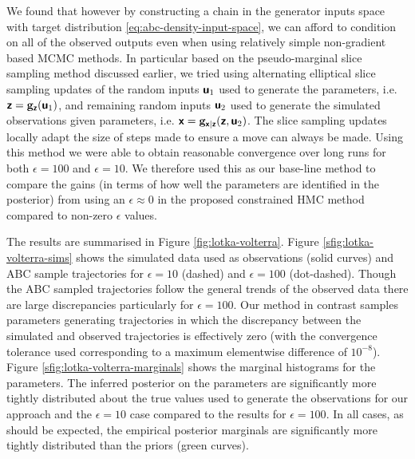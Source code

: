 We found that however by constructing a chain in the generator inputs space with target distribution \eqref{eq:abc-density-input-space}, we can afford to condition on all of the observed outputs even when using relatively simple non-gradient based \ac{MCMC} methods. In particular based on the pseudo-marginal slice sampling method \citep{murray2010slice} discussed earlier, we tried using alternating elliptical slice sampling updates of the random inputs $\boldsymbol{\mathsf{u}}_1$ used to generate the parameters, i.e. $\boldsymbol{\mathsf{z}} = {\mathbf{g}}_{\boldsymbol{\mathsf{z}}}(\boldsymbol{\mathsf{u}}_1)$, and remaining random inputs $\boldsymbol{\mathsf{u}}_2$ used to generate the simulated observations given parameters, i.e. $\boldsymbol{\mathsf{x}} = {\mathbf{g}}_{\boldsymbol{\mathsf{x}}|\boldsymbol{\mathsf{z}}}(\boldsymbol{\mathsf{z}},\boldsymbol{\mathsf{u}}_2)$. The slice sampling updates locally adapt the size of steps made to ensure a move can always be made. Using this method we were able to obtain reasonable convergence over long runs for both $\epsilon=100$ and $\epsilon=10$. We therefore used this as our base-line method to compare the gains (in terms of how well the parameters are identified in the posterior) from using an $\epsilon \approx 0$ in the proposed constrained \ac{HMC} method compared to non-zero $\epsilon$ values.

The results are summarised in Figure \ref{fig:lotka-volterra}. Figure \ref{sfig:lotka-volterra-sims} shows the simulated data used as observations (solid curves) and \ac{ABC} sample trajectories for $\epsilon=10$ (dashed) and $\epsilon=100$ (dot-dashed). Though the \ac{ABC} sampled trajectories follow the general trends of the observed data there are large discrepancies particularly for $\epsilon=100$. Our method in contrast samples parameters generating trajectories in which the discrepancy between the simulated and observed trajectories is effectively zero (with the convergence tolerance used corresponding to a maximum elementwise difference of $10^{-8}$). Figure \ref{sfig:lotka-volterra-marginals} shows the marginal histograms for the parameters. The inferred posterior on the parameters are significantly more tightly distributed about the true values used to generate the observations for our approach and the $\epsilon=10$ case compared to the results for $\epsilon=100$. In all cases, as should be expected, the empirical posterior marginals are significantly more tightly distributed than the priors (green curves).

